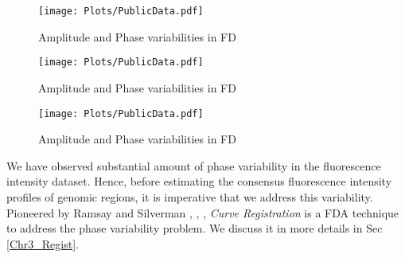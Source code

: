 \begin{figure}[H]
\begin{center}
\texttt{[image: Plots/PublicData.pdf]}
\end{center}
\caption{Amplitude and Phase variabilities in FD}
\label{fig:Fig3_growthF}
\end{figure}

\begin{figure}[H]
\begin{center}
\texttt{[image: Plots/PublicData.pdf]}
\end{center}
\caption{Amplitude and Phase variabilities in FD}
\label{fig:Fig3_handwrit}
\end{figure}

\begin{figure}[H]
\begin{center}
\texttt{[image: Plots/PublicData.pdf]}
\end{center}
\caption{Amplitude and Phase variabilities in FD}
\label{fig:Fig3_pinch}
\end{figure}

We have observed substantial amount of phase variability in the fluorescence intensity dataset. Hence, before estimating the consensus fluorescence intensity profiles of genomic regions, it is imperative that we address this variability. Pioneered by Ramsay and Silverman \cite{Ramsay_2006_Functional}, \cite{Ramsay_Li_1998_JRSSB}, \cite{Ramsay_etal_2009_Functional_R}, {\emph{Curve Registration}} is a FDA technique to address the phase variability problem. We discuss it in more details in Sec \ref{Chr3_Regist}.

